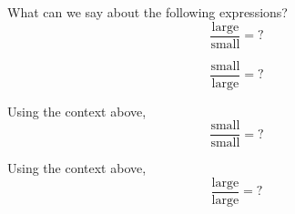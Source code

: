 \documentclass{ximera}
\begin{document}


\begin{problem}
  What can we say about the following expressions?
  \[
  \frac{\text{large}}{\text{small}} = ?
  \]
  \begin{multipleChoice}
  \end{multipleChoice}
\end{problem}

\begin{problem}
 \[
  \frac{\text{small}}{\text{large}} = ?
  \]
  \begin{multipleChoice}
  \end{multipleChoice}
\end{problem}

\begin{problem}
  Using the context above, 
  \[
  \frac{\text{small}}{\text{small}} = ?
  \]
  \begin{multipleChoice}
  \end{multipleChoice}
\end{problem}

\begin{problem}
  Using the context above, 
  \[
  \frac{\text{large}}{\text{large}} = ?
  \]
  \begin{multipleChoice}
  \end{multipleChoice}
\end{problem}


\end{document}
